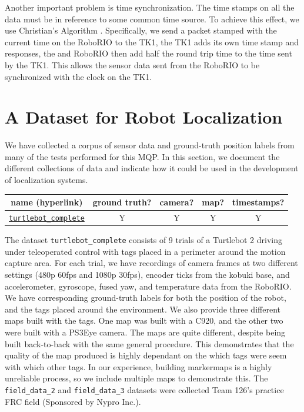 \documentclass{article}
\begin{document}
		Another important problem is time synchronization. The time stamps on all the data must be in reference to some common time source. To achieve this effect, we use Christian's Algorithm \cite{cristian_probabilistic_1989}. Specifically, we send a packet stamped with the current time on the RoboRIO to the TK1, the TK1 adds its own time stamp and responses, the and RoboRIO then add half the round trip time to the time sent by the TK1. This allows the sensor data sent from the RoboRIO to be synchronized with the clock on the TK1.




\section{A Dataset for Robot Localization} \label{section:dataset}

  We have collected a corpus of sensor data and ground-truth position labels from many of the tests performed for this MQP. In this section, we document the different collections of data and indicate how it could be used in the development of localization systems.

  \begin{table}[H]
    \centering
    \begin{tabular}{|c|c|c|c|c|} \hline
      name (hyperlink) & ground truth? & camera? & map? & timestamps? \\ \hline
      \href{https://users.wpi.edu/~pdmitrano/phil-datasets/turtlebot_mocap_complete.tar.gz}{\texttt{turtlebot\_complete}} & Y & Y & Y & Y \\ \hline
    \end{tabular}
    \label{table:datasets}
  \end{table}

  The dataset \texttt{turtlebot\_complete} consists of 9 trials of a Turtlebot 2 driving under teleoperated control with tags placed in a perimeter around the motion capture area. For each trial, we have recordings of camera frames at two different settings (480p 60fps and 1080p 30fps), encoder ticks from the kobuki base, and accelerometer, gyroscope, fused yaw, and temperature data from the RoboRIO. We have corresponding ground-truth labels for both the position of the robot, and the tags placed around the environment. We also provide three different maps built with the tags. One map was built with a C920, and the other two were built with a PS3Eye camera. The maps are quite different, despite being built back-to-back with the same general procedure. This demonstrates that the quality of the map produced is highly dependant on the which tags were seem with which other tags. In our experience, building markermaps is a highly unreliable process, so we include multiple maps to demonstrate this.
  The \texttt{field\_data\_2} and \texttt{field\_data\_3} datasets were collected Team 126's practice FRC field (Sponsored by Nypro Inc.).
\end{document}

